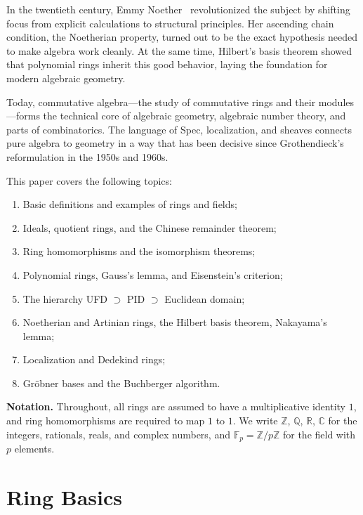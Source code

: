 \documentclass[12pt,a4paper]{amsart}
\theoremstyle{definition}
\theoremstyle{definition}
\begin{document}
In the twentieth century, Emmy Noether~\cite{Noether1921} revolutionized the subject
by shifting focus from explicit calculations to structural principles. Her ascending
chain condition, the Noetherian property, turned out to be the exact hypothesis
needed to make algebra work cleanly. At the same time, Hilbert's basis theorem
showed that polynomial rings inherit this good behavior, laying the foundation for
modern algebraic geometry.

Today, commutative algebra---the study of commutative rings and their modules---forms
the technical core of algebraic geometry, algebraic number theory, and parts of
combinatorics. The language of Spec, localization, and sheaves connects pure algebra
to geometry in a way that has been decisive since Grothendieck's reformulation in the
1950s and 1960s.

This paper covers the following topics:
\begin{enumerate}[label=(\roman*)]
  \item Basic definitions and examples of rings and fields;
  \item Ideals, quotient rings, and the Chinese remainder theorem;
  \item Ring homomorphisms and the isomorphism theorems;
  \item Polynomial rings, Gauss's lemma, and Eisenstein's criterion;
  \item The hierarchy UFD $\supset$ PID $\supset$ Euclidean domain;
  \item Noetherian and Artinian rings, the Hilbert basis theorem, Nakayama's lemma;
  \item Localization and Dedekind rings;
  \item Gröbner bases and the Buchberger algorithm.
\end{enumerate}

\medskip

\noindent\textbf{Notation.} Throughout, all rings are assumed to have a multiplicative
identity $1$, and ring homomorphisms are required to map $1$ to $1$.
We write $\mathbb{Z}$, $\mathbb{Q}$, $\mathbb{R}$, $\mathbb{C}$ for the integers,
rationals, reals, and complex numbers, and $\mathbb{F}_p = \mathbb{Z}/p\mathbb{Z}$
for the field with $p$ elements.

\section{Ring Basics}
\end{document}
